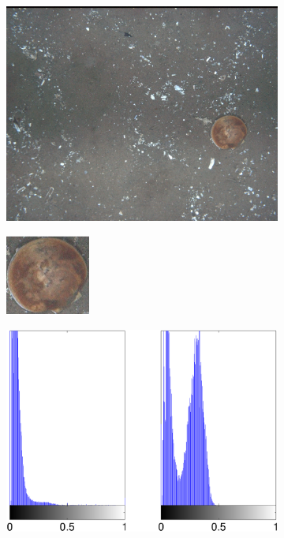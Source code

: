 \documentclass {udthesis}
\begin{document}
\begin{figure}
  \centering
  \begin{minipage}[c]{\textwidth}
    \centering
    \begin{subfigure}[]{\textwidth}
	\includegraphics[height=0.24\textwidth,natwidth=1280,natheight=1014]{77616}
	\caption{}
	\label{subfig:dawkins}
    \end{subfigure}
    \begin{subfigure}[]{0.25\textwidth}
	\includegraphics[width=\textwidth,natwidth=105,natheight=100]{dawkins_crop_resize}
	\caption{}
	\label{subfig:dawkins_crop}
	\hskip 15pt
    \end{subfigure}
    \begin{subfigure}[]{0.33\textwidth}
	\includegraphics[width=\textwidth]{dawkins_hist_sat}

\end{subfigure}
\end{minipage}
\end{figure}
\end{document}
